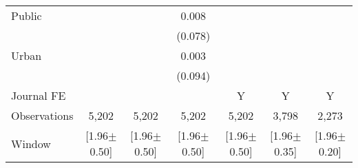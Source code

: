 \begin{tabular}{l*{6}{c}}
Public          &         &         &    0.008&         &         &         \\
                &         &         &  (0.078)&         &         &         \\
Urban           &         &         &    0.003&         &         &         \\
                &         &         &  (0.094)&         &         &         \\
Journal FE      &         &         &         &        Y&        Y&        Y\\
\hline
Observations    &    5,202&    5,202&    5,202&    5,202&    3,798&    2,273\\
Window          &[1.96$\pm$0.50]&[1.96$\pm$0.50]&[1.96$\pm$0.50]&[1.96$\pm$0.50]&[1.96$\pm$0.35]&[1.96$\pm$0.20]\\
\hline\hline
\end{tabular}
